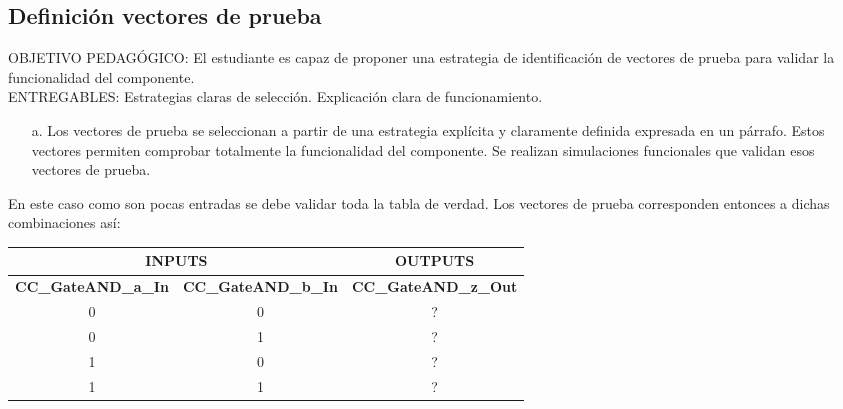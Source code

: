 \subsection{Definición vectores de prueba}
\scriptsize
	\begin{tcolorbox}[enhanced,title=PRODUCTO DE CALIDAD:,colframe=colorA1,colback=colorA2,arc=0mm,colbacktitle=white,fonttitle=\bfseries,coltitle=white,attach boxed title to top left={xshift=3.2mm,yshift=-0.50mm},boxed title style={skin=enhancedfirst jigsaw,size=small,arc=0mm,bottom=1mm,interior style={fill=none,top color=color2,bottom color=color2},,boxrule=0pt},boxrule=0pt]
		OBJETIVO PEDAGÓGICO: El estudiante es capaz de proponer una estrategia de identificación de vectores de prueba para validar la funcionalidad del componente.\\
		ENTREGABLES: Estrategias claras de selección. Explicación clara de funcionamiento.
		\begin{enumerate}
			\item[a.] Los vectores de prueba se seleccionan a partir de una estrategia explícita y claramente definida expresada en un párrafo. Estos vectores permiten comprobar totalmente la funcionalidad del componente. Se realizan simulaciones funcionales que validan esos vectores de prueba. 
		\end{enumerate}
	\end{tcolorbox}

\normalsize

	En este caso como son pocas entradas se debe validar toda la tabla de verdad. Los vectores de prueba corresponden entonces a dichas combinaciones así:
		\begin{center}
			\begin{tabular}{|c|c|c|}
			\hline
			\multicolumn{2}{|c|}{\cellcolor{colorIN1}\textbf{INPUTS}} & \multicolumn{1}{c|}{\cellcolor{colorOUT1}\textbf{OUTPUTS}} \\ \hline
			\cellcolor{colorIN1}\textbf{CC\_GateAND\_a\_In} 	& \cellcolor{colorIN1}\textbf{CC\_GateAND\_b\_In} 	& 	\cellcolor{colorOUT1} \textbf{CC\_GateAND\_z\_Out}	\\ \hline
			\cellcolor{colorIN2} 0								& \cellcolor{colorIN2} 0							& 	\cellcolor{colorOUT2} ?								\\ \hline
			\cellcolor{colorIN2} 0								& \cellcolor{colorIN2} 1							& 	\cellcolor{colorOUT2} ?								\\ \hline
			\cellcolor{colorIN2} 1								& \cellcolor{colorIN2} 0							& 	\cellcolor{colorOUT2} ?								\\ \hline
			\cellcolor{colorIN2} 1								& \cellcolor{colorIN2} 1							& 	\cellcolor{colorOUT2} ?								\\ \hline
			\end{tabular}
		\end{center}

